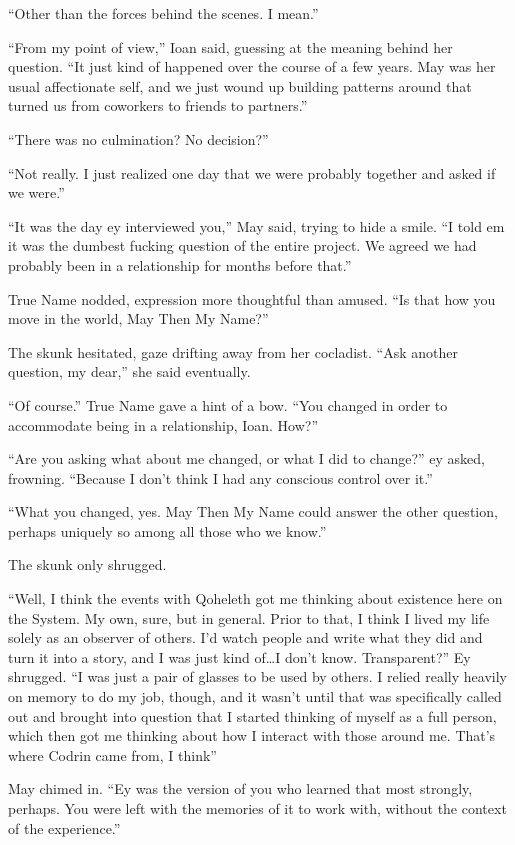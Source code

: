 ``Other than the forces behind the scenes. I mean.''

``From my point of view,'' Ioan said, guessing at the meaning behind her question. ``It just kind of happened over the course of a few years. May was her usual affectionate self, and we just wound up building patterns around that turned us from coworkers to friends to partners.''

``There was no culmination? No decision?''

``Not really. I just realized one day that we were probably together and asked if we were.''

``It was the day ey interviewed you,'' May said, trying to hide a smile. ``I told em it was the dumbest fucking question of the entire project. We agreed we had probably been in a relationship for months before that.''

True Name nodded, expression more thoughtful than amused. ``Is that how you move in the world, May Then My Name?''

The skunk hesitated, gaze drifting away from her cocladist. ``Ask another question, my dear,'' she said eventually.

``Of course.'' True Name gave a hint of a bow. ``You changed in order to accommodate being in a relationship, Ioan. How?''

``Are you asking what about me changed, or what I did to change?'' ey asked, frowning. ``Because I don't think I had any conscious control over it.''

``What you changed, yes. May Then My Name could answer the other question, perhaps uniquely so among all those who we know.''

The skunk only shrugged.

``Well, I think the events with Qoheleth got me thinking about existence here on the System. My own, sure, but in general. Prior to that, I think I lived my life solely as an observer of others. I'd watch people and write what they did and turn it into a story, and I was just kind of\ldots I don't know. Transparent?'' Ey shrugged. ``I was just a pair of glasses to be used by others. I relied really heavily on memory to do my job, though, and it wasn't until that was specifically called out and brought into question that I started thinking of myself as a full person, which then got me thinking about how I interact with those around me. That's where Codrin came from, I think''

May chimed in. ``Ey was the version of you who learned that most strongly, perhaps. You were left with the memories of it to work with, without the context of the experience.''

